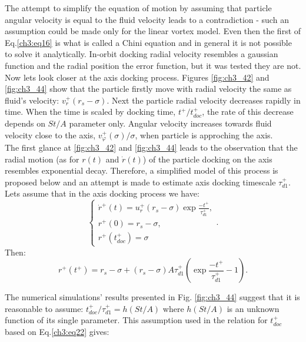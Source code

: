 \documentclass[../main.tex]{subfiles}
\begin{document}
The attempt to simplify the equation of motion by assuming that particle angular velocity is equal to the fluid velocity leads to a contradiction - such an assumption could be made only for the linear vortex model. Even then the first of Eq.\ref{ch3:eq16} is what is called a Chini equation and in general it is not possible to solve it analytically. In-orbit docking radial velocity resembles a gaussian function and the radial position the error function, but it was tested they are not.\\
Now lets look closer at the axis docking process. Figures \ref{fig:ch3_42} and \ref{fig:ch3_44} show that  the particle firstly move with radial velocity the same as fluid's velocity: $v^+_r(r_s-\sigma)$. Next the particle radial velocity decreases rapidly in time. When the time is scaled by docking time, $t^+/t^+_{doc}$, the rate of this decrease depends on $St/A$ parameter only. Angular velocity increases towards fluid velocity close to the axis, $v^+_{\varphi}(\sigma)/\sigma$, when particle is approching the axis.\\
\noindent The first glance at \ref{fig:ch3_42} and \ref{fig:ch3_44} leads to the observation that the radial motion (as for $r(t)$ and $\dot{r}(t)$) of the particle docking on the axis resembles exponential decay. Therefore, a simplified model of this process is proposed below and an attempt is made to estimate axis docking timescale $\tau^+_{d1}$.\\
Lets assume that in the axis docking process we have:
\begin{equation}
\left\{\begin{array}{l}
\dot{r}^+(t)=u_r^+(r_s-\sigma) \exp \frac{-t^+}{\tau^+_{d1}}, \\
r^+(0)=r_s-\sigma, \\
r^+(t^+_{doc})=\sigma 
\end{array}.\right.
\label{ch3:eq22}
\end{equation}
Then:
\begin{equation}
r^+(t^+)=r_s-\sigma+(r_s-\sigma)A\tau^+_{d1}\left(\exp\frac{-t^+}{\tau^+_{d1}}-1\right).
\label{ch3:eq23}
\end{equation}

The numerical simulations' results presented in Fig. \ref{fig:ch3_44} suggest that it is reasonable to assume: $t^+_{doc}/\tau^+_{d1}= h\left(St/A\right)$ where $h\left(St/A\right)$ is an unknown function of its single parameter. This assumption used in the relation for $t^+_{doc}$ based on Eq.\ref{ch3:eq22} gives:
\end{document}
